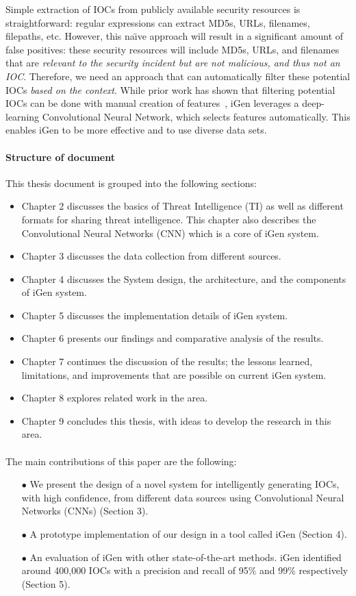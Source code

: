 Simple extraction of IOCs from publicly available security resources is straightforward: regular expressions can extract MD5s, URLs, filenames, filepaths, etc. However, this na\"{\i}ve approach will result in a significant amount of false positives: these security resources will include MD5s, URLs, and filenames that are \emph{relevant to the security incident but are not malicious, and thus not an IOC}. Therefore, we need an approach that can automatically filter these potential IOCs \emph{based on the context}.
While prior work has shown that filtering potential IOCs can be done with manual creation of features~\cite{liao}, iGen leverages a deep-learning Convolutional Neural Network, which selects features automatically. This enables iGen to be more effective and to use diverse data sets. 

\paragraph{Structure of document} %
This thesis document is grouped into the following sections:
\begin{itemize}
	\item Chapter 2 discusses the basics of Threat Intelligence (TI) as well as different formats for sharing threat intelligence. This chapter also describes the Convolutional Neural Networks (CNN) which is a core of iGen system. 
	\item Chapter 3 discusses the data collection from different sources.
	\item Chapter 4 discusses the System design, the architecture, and the components of iGen system.
	\item Chapter 5 discusses the implementation details of iGen system.
	\item Chapter 6 presents our findings and comparative analysis of the results.
	\item Chapter 7 continues the discussion of the results; the lessons learned, limitations, and improvements that are possible on current iGen system.
	\item Chapter 8 explores related work in the area.
	\item Chapter 9 concludes this thesis, with ideas to develop the research in this area.
\end{itemize}

\paragraph{} %
The main contributions of this paper are the following:
\begin{itemize}
 \item[$\bullet$ ] We present the design of a novel system for intelligently generating IOCs, with high confidence, from different data sources using Convolutional Neural Networks (CNNs) (Section 3). 
  \item[$\bullet$ ] A prototype implementation of our design in a tool called iGen (Section 4).
  \item[$\bullet$ ] An evaluation of iGen with other state-of-the-art methods. iGen identified around 400,000 IOCs with a precision and recall of 95\% and 99\% respectively (Section 5). 
\end{itemize}
